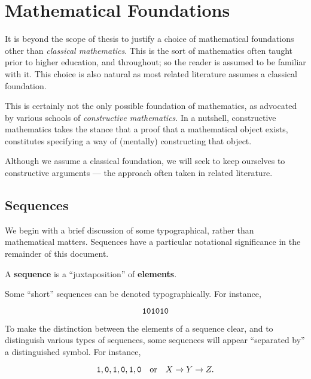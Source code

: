 \section{Mathematical Foundations}

\label{sec:preface:mathematical-foundations}

\def\strue{\ensuremath{\text{\textsc{True}}}}
\def\sfalse{\ensuremath{\text{\textsc{False}}}}

It is beyond the scope of thesis to justify a choice of mathematical
foundations other than \emph{classical mathematics}. This is the sort of
mathematics often taught prior to higher education, and throughout; so the
reader is assumed to be familiar with it. This choice is also natural as most
related literature assumes a classical foundation.

This is certainly not the only possible foundation of mathematics, as advocated
by various schools of \emph{constructive mathematics}. In a nutshell,
constructive mathematics takes the stance that a proof that a mathematical
object exists, constitutes specifying a way of (mentally) constructing that
object.

Although we assume a classical foundation, we will seek to keep ourselves to
constructive arguments --- the approach often taken in related literature.

\subsection{Sequences}

We begin with a brief discussion of some typographical, rather than
mathematical matters. Sequences have a particular notational significance in
the remainder of this document.

\begin{notion}

A \textbf{sequence} is a ``juxtaposition'' of \textbf{elements}.

\end{notion}

Some ``short'' sequences can be denoted typographically. For instance,

$$\mathtt{1}\mathtt{0}\mathtt{1}\mathtt{0}\mathtt{1}\mathtt{0}$$

To make the distinction between the elements of a sequence clear, and to
distinguish various types of sequences, some sequences will appear ``separated
by'' a distinguished symbol. For instance,

$$\mathtt{1},\mathtt{0},\mathtt{1},\mathtt{0},\mathtt{1},\mathtt{0} \quad \text{or} \quad
X\rightarrow Y \rightarrow Z.$$

